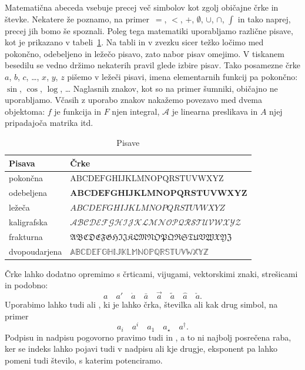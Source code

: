Matematična abeceda vsebuje precej več simbolov kot zgolj običajne črke in števke. Nekatere že poznamo, na primer~$=$, $<$, $+$, $\emptyset$, $\cup$, $\cap$, $\int$ in tako naprej, precej jih bomo še spoznali. Poleg tega matematiki uporabljamo različne pisave, kot je prikazano v tabeli~\ref{tabela:oblike-crk}. Na tabli in v zvezku sicer težko ločimo med pokončno, odebeljeno in ležečo pisavo, zato nabor pisav omejimo. V tiskanem besedilu se vedno držimo nekaterih pravil glede izbire pisav. Tako posamezne črke $a$, $b$, $c$, \ldots, $x$, $y$, $z$ pišemo v ležeči pisavi, imena elementarnih funkcij pa pokončno: $\sin$, $\cos$, $\log$, \ldots{} Naglasnih znakov, kot so na primer šumniki, običajno ne uporabljamo. Včasih z uporabo znakov nakažemo povezavo med dvema objektoma: $f$ je funkcija in $F$ njen integral, $\mathcal{A}$ je linearna preslikava in $A$ njej pripadajoča matrika itd.

\begin{table}[htp]
\centering
\small
\begin{tabular}{ll}
  \toprule
  Pisava & Črke \\ \midrule
  pokončna      & $\mathrm{ABCDEFGHIJKLMNOPQRSTUVWXYZ}$ \\
  odebeljena    & $\mathbf{ABCDEFGHIJKLMNOPQRSTUVWXYZ}$ \\
  ležeča        & $ABCDEFGHIJKLMNOPQRSTUVWXYZ$ \\
  kaligrafska   & $\mathcal{ABCDEFGHIJKLMNOPQRSTUVWXYZ}$ \\
  frakturna     & $\mathfrak{ABCDEFGHIJKLMNOPQRSTUVWXYZ}$ \\
  dvopoudarjena & $\mathbb{ABCDEFGHIJKLMNOPQRSTUVWXYZ}$ \\
  \bottomrule
\end{tabular}
\caption{Pisave}\label{tabela:oblike-crk}
\end{table}

Črke lahko dodatno opremimo s črticami, vijugami, vektorskimi znaki, strešicami in podobno:
%
\begin{equation*}
 a \quad
 a' \quad
 \dot{a} \quad
 \bar{a} \quad
 \vec{a} \quad
 \tilde{a} \quad
 \hat{a} \quad
 \check{a}.
\end{equation*}
%
Uporabimo lahko tudi  ali
, ki je lahko črka, številka ali kak drug simbol, na primer
%
\begin{equation*}
  a_i \quad
  a^i \quad
  a_1 \quad
  a_{\star} \quad
  a^{\dagger}.
\end{equation*}
%
Podpisu in nadpisu pogovorno pravimo tudi  in , a to ni
najbolj posrečena raba, ker se indeks lahko pojavi tudi v nadpisu ali kje drugje,
eksponent pa lahko pomeni tudi število, s katerim potenciramo.

